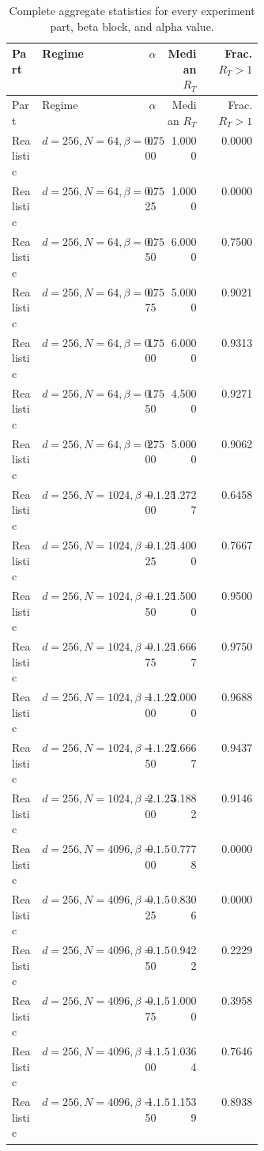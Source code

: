 \documentclass[11pt]{article}
\newcommand{\tratio}{R_T}
\begin{document}
\small
\begin{longtable}{L{0.12\linewidth}L{0.25\linewidth}rrr}
\caption{Complete aggregate statistics for every experiment part, beta block, and alpha value.}\\
\toprule
Part & Regime & $\alpha$ & Median $\tratio$ & Frac. $\tratio>1$ \\
\midrule
\endfirsthead
\toprule
Part & Regime & $\alpha$ & Median $\tratio$ & Frac. $\tratio>1$ \\
\midrule
\endhead
Realistic & $d=256,N=64,\beta=0.75$ & 0.00 & 1.0000 & 0.0000 \\
Realistic & $d=256,N=64,\beta=0.75$ & 0.25 & 1.0000 & 0.0000 \\
Realistic & $d=256,N=64,\beta=0.75$ & 0.50 & 6.0000 & 0.7500 \\
Realistic & $d=256,N=64,\beta=0.75$ & 0.75 & 5.0000 & 0.9021 \\
Realistic & $d=256,N=64,\beta=0.75$ & 1.00 & 6.0000 & 0.9313 \\
Realistic & $d=256,N=64,\beta=0.75$ & 1.50 & 4.5000 & 0.9271 \\
Realistic & $d=256,N=64,\beta=0.75$ & 2.00 & 5.0000 & 0.9062 \\
Realistic & $d=256,N=1024,\beta=1.25$ & 0.00 & 1.2727 & 0.6458 \\
Realistic & $d=256,N=1024,\beta=1.25$ & 0.25 & 1.4000 & 0.7667 \\
Realistic & $d=256,N=1024,\beta=1.25$ & 0.50 & 1.5000 & 0.9500 \\
Realistic & $d=256,N=1024,\beta=1.25$ & 0.75 & 1.6667 & 0.9750 \\
Realistic & $d=256,N=1024,\beta=1.25$ & 1.00 & 2.0000 & 0.9688 \\
Realistic & $d=256,N=1024,\beta=1.25$ & 1.50 & 2.6667 & 0.9437 \\
Realistic & $d=256,N=1024,\beta=1.25$ & 2.00 & 3.1882 & 0.9146 \\
Realistic & $d=256,N=4096,\beta=1.5$ & 0.00 & 0.7778 & 0.0000 \\
Realistic & $d=256,N=4096,\beta=1.5$ & 0.25 & 0.8306 & 0.0000 \\
Realistic & $d=256,N=4096,\beta=1.5$ & 0.50 & 0.9422 & 0.2229 \\
Realistic & $d=256,N=4096,\beta=1.5$ & 0.75 & 1.0000 & 0.3958 \\
Realistic & $d=256,N=4096,\beta=1.5$ & 1.00 & 1.0364 & 0.7646 \\
Realistic & $d=256,N=4096,\beta=1.5$ & 1.50 & 1.1539 & 0.8938 \\

\end{longtable}
\end{document}
